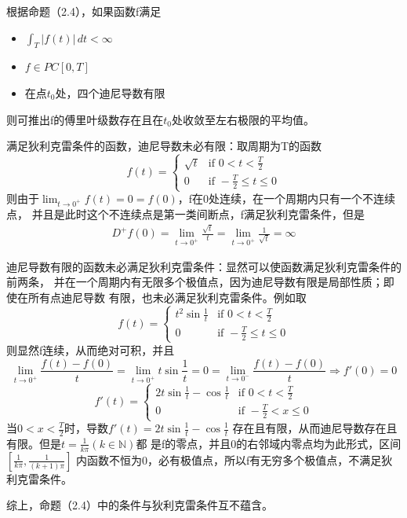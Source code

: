 \documentclass{ctexart}
\begin{document}
根据命题（2.4），如果函数f满足\begin{itemize}
    \item $\int_{T}|f(t)|\,dt<\infty$
    \item $f\in PC[0,T]$
    \item 在点$t_0$处，四个迪尼导数有限
\end{itemize}
则可推出f的傅里叶级数存在且在$t_0$处收敛至左右极限的平均值。

满足狄利克雷条件的函数，迪尼导数未必有限：取周期为T的函数
\[f(t)=\begin{cases}
        \sqrt{t} & \text{if }0<t< \frac{T}{2}         \\
        0        & \text{if }-\frac{T}{2}\leq t\leq 0
    \end{cases}\]
则由于$\lim_{t\to 0^+}f(t)=0=f(0)$，f在0处连续，在一个周期内只有一个不连续点，
并且是此时这个不连续点是第一类间断点，f满足狄利克雷条件，但是
\begin{align*}
    D^+f(0)=\lim_{t\to 0^+}\frac{\sqrt{t}}{t}=\lim_{t\to 0^+}\frac{1}{\sqrt{t}}=\infty
\end{align*}

迪尼导数有限的函数未必满足狄利克雷条件：显然可以使函数满足狄利克雷条件的前两条，
并在一个周期内有无限多个极值点，因为迪尼导数有限是局部性质；即使在所有点迪尼导数
有限，也未必满足狄利克雷条件。例如取
\[f(t)=\begin{cases}
        t^2\sin\frac{1}{t} & \text{if }0<t<\frac{T}{2}          \\
        0                  & \text{if }-\frac{T}{2}\leq t\leq 0
    \end{cases}\]
则显然f连续，从而绝对可积，并且
\[\lim_{t\to 0^+}\frac{f(t)-f(0)}{t}=\lim_{t\to 0^+}t\sin\frac{1}{t}=0=\lim_{t\to 0^-}\frac{f(t)-f(0)}{t}\Rightarrow f'(0)=0\]
\[f'(t)=
    \begin{cases}
        2t\sin\frac{1}{t}-\cos\frac{1}{t} & \text{if }0<t<\frac{T}{2}      \\
        0                                 & \text{if }-\frac{T}{2}<x\leq 0
    \end{cases}\]
当$0<x<\frac{T}{2}$时，导数$f'(t)=2t\sin\frac{1}{t}-\cos\frac{1}{t}$
存在且有限，从而迪尼导数存在且有限。但是$t=\frac{1}{k\pi}(k\in\mathbb{N})$都
是f的零点，并且0的右邻域内零点均为此形式，区间$[\frac{1}{k\pi},\frac{1}{(k+1)\pi}]$
内函数不恒为0，必有极值点，所以f有无穷多个极值点，不满足狄利克雷条件。

综上，命题（2.4）中的条件与狄利克雷条件互不蕴含。
\end{document}
